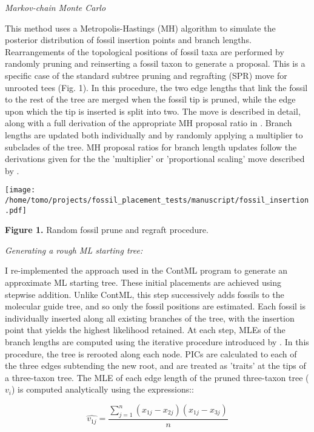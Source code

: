 \documentclass[12pt]{article}
\begin{document}
\noindent\emph{Markov-chain Monte Carlo}

 This method uses a
 Metropolis-Hastings (MH) algorithm \citep{hastings1970monte} to simulate the posterior distribution of fossil insertion points
and branch lengths. Rearrangements of the topological positions of fossil taxa are performed by randomly pruning
and reinserting a fossil taxon to generate a proposal. This is a
specific case of the standard subtree pruning and regrafting (SPR) move
for unrooted tees (Fig. 1). In this procedure, the two edge lengths that link the fossil to the rest of the tree are merged when the fossil tip is pruned,
while the edge upon which the tip is inserted is split into two. The move is described in detail, along with a full derivation of the appropriate
MH proposal ratio in \cite[p. 287]{yang2014molecular}.  Branch lengths are updated both individually and by randomly applying a
multiplier to subclades of the tree. MH proposal ratios for branch length updates follow the derivations given for the  the 'multiplier' or 'proportional scaling'
 move described by \cite[p. 225]{yang2014molecular}.

\texttt{[image: /home/tomo/projects/fossil\_placement\_tests/manuscript/fossil\_insertion.pdf]}

\textbf{Figure 1.} Random fossil prune and regraft procedure. 


\noindent\emph{Generating a rough ML starting tree:}

I re-implemented the approach used in the ContML program to generate an approximate ML starting tree. These initial placements are
achieved using stepwise addition. Unlike ContML, this step successively adds fossils to the molecular guide tree, and so only the fossil positions are estimated. 
Each fossil is individually inserted along all existing branches of the tree, with the insertion point that
yields the highest likelihood retained. At each step, MLEs of the branch
lengths are computed using the iterative procedure introduced by
\citep{felsenstein1981evolutionary}. In this procedure, the tree is rerooted along each
node. PICs are calculated to each of the three edges subtending the new
root, and are treated as 'traits' at the tips of a three-taxon tree. The MLE of each edge length of the pruned three-taxon tree  ($v_i$) is computed analytically
using the expressions::

\begin{equation}
 \hat{v_{1j}} =   \frac{\sum\limits_{j=1}^{n}(x_{1j}- x_{2j}) (x_{1j} - x_{3j}) }{n}
\end{equation}
\end{document}
